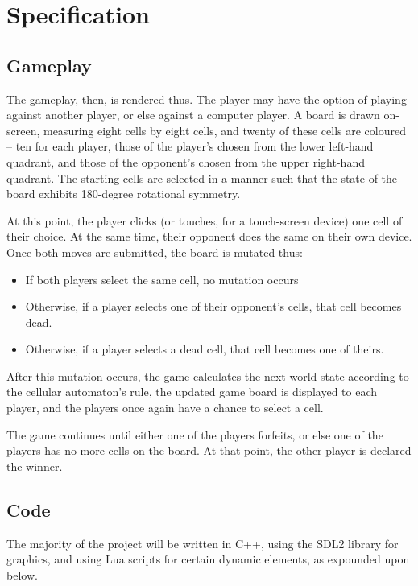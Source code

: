 \documentclass[letterpaper]{article}
\begin{document}
\section{Specification}

\subsection{Gameplay}

The gameplay, then, is rendered thus. The player may have the option of playing against another player, or else against a computer player. A board is drawn on-screen, measuring eight cells by eight cells, and twenty of these cells are coloured -- ten for each player, those of the player's chosen from the lower left-hand quadrant, and those of the opponent's chosen from the upper right-hand quadrant. The starting cells are selected in a manner such that the state of the board exhibits 180-degree rotational symmetry.

At this point, the player clicks (or touches, for a touch-screen device) one cell of their choice. At the same time, their opponent does the same on their own device. Once both moves are submitted, the board is mutated thus:

\begin{itemize}
	\item If both players select the same cell, no mutation occurs
	\item Otherwise, if a player selects one of their opponent's cells, that cell becomes dead.
	\item Otherwise, if a player selects a dead cell, that cell becomes one of theirs.
\end{itemize}

After this mutation occurs, the game calculates the next world state according to the cellular automaton's rule, the updated game board is displayed to each player, and the players once again have a chance to select a cell.

The game continues until either one of the players forfeits, or else one of the players has no more cells on the board. At that point, the other player is declared the winner.

\subsection{Code}

The majority of the project will be written in C++, using the SDL2 library for graphics, and using Lua scripts for certain dynamic elements, as expounded upon below.
\end{document}
